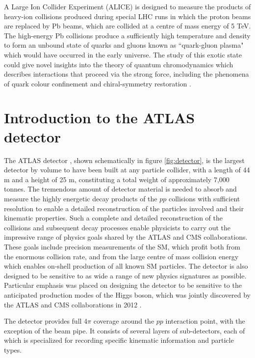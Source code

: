 A Large Ion Collider Experiment (ALICE) \cite{ALICE} is designed to measure the products of heavy-ion collisions produced during special LHC runs in which the proton beams are replaced by Pb beams, which are collided at a centre of mass energy of 5 TeV. The high-energy Pb collisions produce a sufficiently high temperature and density to form an unbound state of quarks and gluons known as ``quark-gluon plasma" which would have occurred in the early universe. The study of this exotic state could give novel insights into the theory of quantum chromodynamics which describes interactions that proceed via the strong force, including the phenomena of quark colour confinement and chiral-symmetry restoration \cite{quark_confinement, Karsch:845568}.


\section{Introduction to the ATLAS detector}
\label{sec:ATLAS_detector_intro}

The ATLAS detector \cite{atlas}, shown schematically in figure \ref{fig:detector}, is the largest detector by volume to have been built at any particle collider, with a length of 44 m and a height of 25 m, constituting a total weight of approximately 7,000 tonnes. The tremendous amount of detector material is needed to absorb and measure the highly energetic decay products of the \(pp\) collisions with sufficient resolution to enable a detailed reconstruction of the particles involved and their kinematic properties. Such a complete and detailed reconstruction of the collisions and subsequent decay processes enable physicists to carry out the impressive range of physics goals shared by the ATLAS and CMS collaborations. These goals include precision measurements of the SM, which profit both from the enormous collision rate, and from the large centre of mass collision energy which enables on-shell production of all known SM particles. The detector is also designed to be sensitive to as wide a range of new physics signatures as possible. Particular emphasis was placed on designing the detector to be sensitive to the anticipated production modes of the Higgs boson, which was jointly discovered by the ATLAS and CMS collaborations in 2012 \cite{atlas_higgs, cms_higgs}. 

The detector provides full 4\(\pi\) coverage around the \(pp\) interaction point, with the exception of the beam pipe. It consists of several layers of sub-detectors, each of which is specialized for recording specific kinematic information and particle types.

